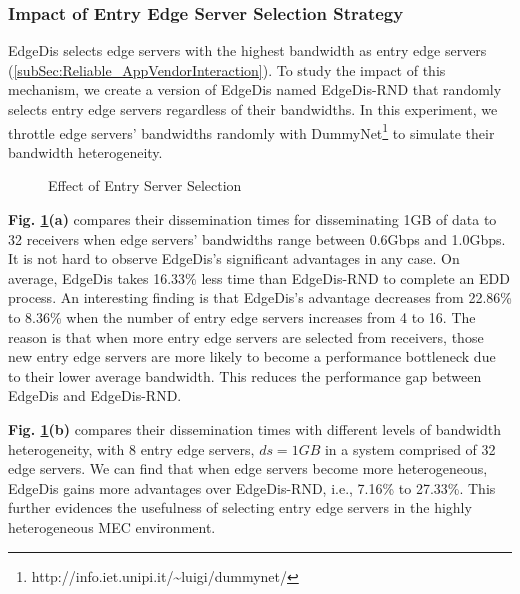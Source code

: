 \documentclass[10pt,journal,compsoc]{IEEEtran}
\begin{document}
%
\subsubsection{Impact of Entry Edge Server Selection Strategy} EdgeDis selects edge servers with the highest bandwidth as entry edge servers (\cref{subSec:Reliable_AppVendorInteraction}). To study the impact of this mechanism, we create a version of EdgeDis named EdgeDis-RND that randomly selects entry edge servers regardless of their bandwidths. In this experiment, we throttle edge servers' bandwidths randomly with DummyNet\footnote{http://info.iet.unipi.it/\textasciitilde luigi/dummynet/} to simulate their bandwidth heterogeneity.



\begin{figure}
    \centering
    \vspace{-1em}
    \caption{Effect of Entry Server Selection}
    \label{fig:Impact_Entry_Selection}
\end{figure}




\textbf{Fig. \ref{fig:Impact_Entry_Selection}(a)} compares their dissemination times for disseminating 1GB of data to 32 receivers when edge servers' bandwidths range between 0.6Gbps and 1.0Gbps. It is not hard to observe EdgeDis's significant advantages in any case. On average, EdgeDis takes 16.33\% less time than EdgeDis-RND to complete an EDD process. An interesting finding is that EdgeDis's advantage decreases from 22.86\% to 8.36\% when the number of entry edge servers increases from 4 to 16. The reason is that when more entry edge servers are selected from receivers, those new entry edge servers are more likely to become a performance bottleneck due to their lower average bandwidth. This reduces the performance gap between EdgeDis and EdgeDis-RND. 

\textbf{Fig. \ref{fig:Impact_Entry_Selection}(b)} compares their dissemination times with different levels of bandwidth heterogeneity, with 8 entry edge servers, $ds = 1GB$ in a system comprised of 32 edge servers. We can find that when edge servers become more heterogeneous, EdgeDis gains more advantages over EdgeDis-RND, i.e., 7.16\% to 27.33\%. This further evidences the usefulness of selecting entry edge servers in the highly heterogeneous MEC environment.
\end{document}
